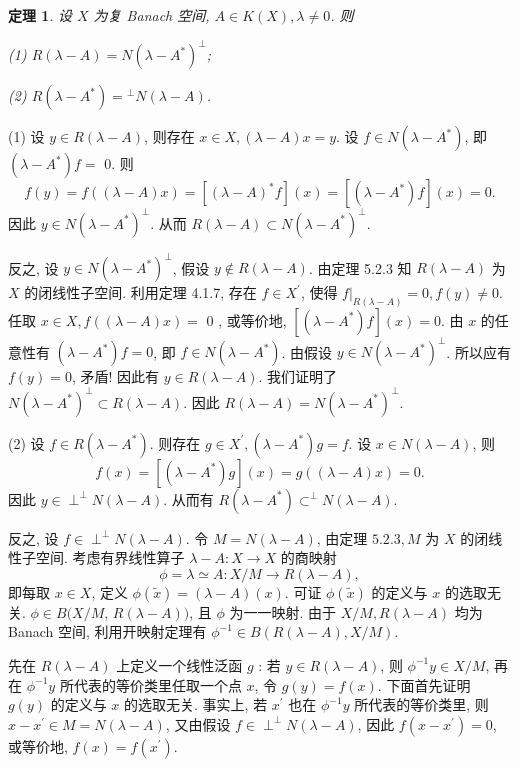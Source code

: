 \documentclass[openany]{ctexbook}
\makeatletter
\theoremstyle{kaiti}
\newtheorem{theorem}{定理}[section]
\theoremstyle{normal}
\renewenvironment{proof}[1][\proofname]{\par
    \pushQED{\qed}%
    \normalfont \topsep6\p@\@plus6\p@\relax
    \trivlist
    \item\relax
    {\heiti #1}\hspace{2\labelsep}\ignorespaces
  }{%
    \popQED\endtrivlist\@endpefalse
  }
\makeatother
\begin{document}
\begin{theorem}
设 $X$ 为复 Banach 空间, $A \in K(X), \lambda \neq 0$. 则

(1) $R(\lambda-A)=N\left(\lambda-A^{*}\right)^{\perp}$;

(2) $R\left(\lambda-A^{*}\right)={ }^{\perp} N(\lambda-A)$.
\end{theorem}

\begin{proof}
(1) 设 $y \in R(\lambda-A)$, 则存在 $x \in X,(\lambda-A) x=y$. 设 $f \in N\left(\lambda-A^{*}\right)$, 即 $\left(\lambda-A^{*}\right) f=$ 0. 则
$$
f(y)=f((\lambda-A) x)=\left[(\lambda-A)^{*} f\right](x)=\left[\left(\lambda-A^{*}\right) f\right](x)=0.
$$
因此 $y \in N\left(\lambda-A^{*}\right)^{\perp}$. 从而 $R(\lambda-A) \subset N\left(\lambda-A^{*}\right)^{\perp}$.

反之, 设 $y \in N\left(\lambda-A^{*}\right)^{\perp}$, 假设 $y \notin R(\lambda-A)$. 由定理 5.2.3 知 $R(\lambda-A)$ 为 $X$ 的闭线性子空间. 利用定理 4.1.7, 存在 $f \in X^{\prime}$, 使得 $\left.f\right|_{R(\lambda-A)}=0, f(y) \neq 0$. 任取 $x \in X, f((\lambda-A) x)=$ 0 , 或等价地, $\left[\left(\lambda-A^{*}\right) f\right](x)=0$. 由 $x$ 的任意性有 $\left(\lambda-A^{*}\right) f=0$, 即 $f \in N\left(\lambda-A^{*}\right)$. 由假设 $y \in N\left(\lambda-A^{*}\right)^{\perp}$. 所以应有 $f(y)=0$, 矛盾! 因此有 $y \in R(\lambda-A)$. 我们证明了 $N\left(\lambda-A^{*}\right)^{\perp} \subset R(\lambda-A)$. 因此 $R(\lambda-A)=N\left(\lambda-A^{*}\right)^{\perp}$.

(2) 设 $f \in R\left(\lambda-A^{*}\right)$. 则存在 $g \in X^{\prime},\left(\lambda-A^{*}\right) g=f$. 设 $x \in N(\lambda-A)$, 则
$$
f(x)=\left[\left(\lambda-A^{*}\right) g\right](x)=g((\lambda-A) x)=0.
$$
因此 $y \in \perp^{\perp} N(\lambda-A)$. 从而有 $R\left(\lambda-A^{*}\right) \subset^{\perp} N(\lambda-A)$.

反之, 设 $f \in \perp^{\perp} N(\lambda-A)$. 令 $M=N(\lambda-A)$, 由定理 $5.2.3, M$ 为 $X$ 的闭线性子空间. 考虑有界线性算子 $\lambda-A: X \rightarrow X$ 的商映射
$$
\phi=\lambda \simeq A: X / M \rightarrow R(\lambda-A),
$$
即每取 $x \in X$, 定义 $\phi(\tilde{x})=(\lambda-A)(x)$. 可证 $\phi(\tilde{x})$ 的定义与 $x$ 的选取无关. $\phi \in B(X / M$, $R(\lambda-A))$, 且 $\phi$ 为一一映射. 由于 $X / M, R(\lambda-A)$ 均为 Banach 空间, 利用开映射定理有 $\phi^{-1} \in B(R(\lambda-A), X / M).$

先在 $R(\lambda-A)$ 上定义一个线性泛函 $g$ : 若 $y \in R(\lambda-A)$, 则 $\phi^{-1} y \in X / M$, 再在 $\phi^{-1} y$ 所代表的等价类里任取一个点 $x$, 令 $g(y)=f(x)$. 下面首先证明 $g(y)$ 的定义与 $x$ 的选取无关. 事实上, 若 $x^{\prime}$ 也在 $\phi^{-1} y$ 所代表的等价类里, 则 $x-x^{\prime} \in M=N(\lambda-A)$, 又由假设 $f \in \perp^{\perp} N(\lambda-A)$, 因此 $f\left(x-x^{\prime}\right)=0$, 或等价地, $f(x)=f\left(x^{\prime}\right)$.


\end{proof}
\end{document}
